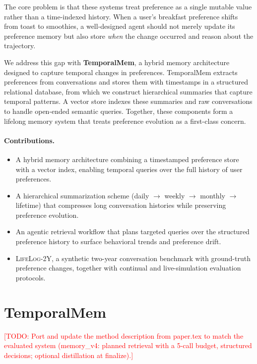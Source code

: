\documentclass[11pt]{article}
\newcommand{\ours}{TemporalMem}
\newcommand{\dataset}{\textsc{LifeLog-2Y}}
\newcommand{\todo}[1]{\textcolor{red}{[TODO: #1]}}
\begin{document}
The core problem is that these systems treat preference as a single mutable value rather than a time-indexed history. When a user's breakfast preference shifts from toast to smoothies, a well-designed agent should not merely update its preference memory but also store \textit{when} the change occurred and reason about the trajectory.

We address this gap with \textbf{\ours}, a hybrid memory architecture designed to capture temporal changes in preferences. \ours{} extracts preferences from conversations and stores them with timestamps in a structured relational database, from which we construct hierarchical summaries that capture temporal patterns. A vector store indexes these summaries and raw conversations to handle open-ended semantic queries. Together, these components form a lifelong memory system that treats preference evolution as a first-class concern.

\paragraph{Contributions.}
\begin{itemize}
    \item A hybrid memory architecture combining a timestamped preference store with a vector index, enabling temporal queries over the full history of user preferences.
    \item A hierarchical summarization scheme (daily $\rightarrow$ weekly $\rightarrow$ monthly $\rightarrow$ lifetime) that compresses long conversation histories while preserving preference evolution.
    \item An agentic retrieval workflow that plans targeted queries over the structured preference history to surface behavioral trends and preference drift.
    \item \dataset, a synthetic two-year conversation benchmark with ground-truth preference changes, together with continual and live-simulation evaluation protocols.
\end{itemize}

\section{\ours}
\label{sec:method}

\todo{Port and update the method description from paper.tex to match the evaluated system (memory\_v4: planned retrieval with a 5-call budget, structured decisions; optional distillation at finalize).}
\end{document}
